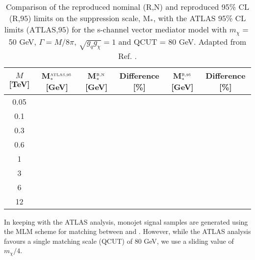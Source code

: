 \begin{flushleft}
\begin{table}[!htbp]
\centering
\begin{tabular}{c|c|c|c|c|c}
 \hline
 \hline
 $M$ [TeV] & M$_{*}^{\mbox{\tiny ATLAS,95}}$ [GeV] & M$_{*}^{\mbox{\tiny R,N}}$ [GeV] & Difference [\%] & M$_{*}^{\mbox{\tiny R,95}}$ [GeV] & Difference [\%] \\ 
 \hline
0.05 & & & & \\
0.1 & & & & \\
0.3 & & & & \\
0.6 & & & & \\
1 & & & & \\
3 & & & & \\
6 & & & & \\
12 & & & & \\
 \hline
 \hline
\end{tabular}
\caption{Comparison of the reproduced nominal ($\mbox{R,N}$) and reproduced 95\% CL ($\mbox{R,95}$) limits on the suppression scale, M$_{*}$, with the ATLAS 95\% CL limits ($\mbox{ATLAS,95}$) for the s-channel vector mediator model with $m_{\chi} = $ 50 GeV, $\Gamma = M/8\pi$, $\sqrt{g_{q}g_{\chi}} = 1$ and QCUT = 80 GeV. Adapted from Ref. \cite{Aad:2015zva}.}
\label{M_star_limits_monojet}
\end{table}
\bigskip

In keeping with the ATLAS analysis, monojet signal samples are generated using the MLM scheme for matching between \MG and \PYTHIA. However, while the ATLAS analysis favours a single matching scale (QCUT) of 80 GeV, we use a sliding value of $m_{\chi}/4$.   


\end{flushleft}
